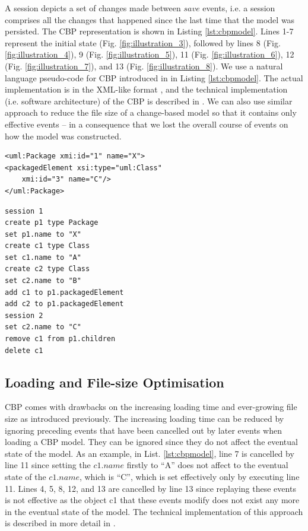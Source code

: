 \documentclass[sigplan,review,anonymous]{acmart}\settopmatter{printfolios=true,printccs=false,printacmref=false}
\begin{document}
A session depicts a set of changes made between $save$ events, i.e. a session comprises all the changes that happened since the last time that the model was persisted. The CBP representation is shown in Listing \ref{lst:cbpmodel}. Lines 1-7 represent the initial state (Fig. \ref{fig:illustration_3}), followed by lines 8 (Fig. \ref{fig:illustration_4}), 9 (Fig. \ref{fig:illustration_5}), 11 (Fig. \ref{fig:illustration_6}), 12 (Fig. \ref{fig:illustration_7}), and 13 (Fig. \ref{fig:illustration_8}). We use a natural language pseudo-code for CBP introduced in \cite{DBLP:conf/models/YohannisKP17,yohannis2018towards} in Listing \ref{lst:cbpmodel}. The actual implementation is in the XML-like format \cite{DBLP:conf/models/YohannisKP17}, and the technical implementation (i.e. software architecture) of the CBP is described in \cite{DBLP:conf/models/YohannisKP17}.  We can also use similar approach to reduce the file size of a change-based model so that it contains only effective events -- in a consequence that we lost the overall course of events on how the model was constructed.

\begin{lstlisting}[style=xmi,caption={The second version of the UML2 example model.},label=lst:xmimodel2]
<uml:Package xmi:id="1" name="X">
<packagedElement xsi:type="uml:Class" 
    xmi:id="3" name="C"/>
</uml:Package>
\end{lstlisting}

\begin{lstlisting}[style=eol,caption={The text CBP of producing state-based model in List. \ref{lst:xmimodel2}. Its visual illustration is in Fig. \ref{fig:illustration_cbp}.},label=lst:cbpmodel]
session 1
create p1 type Package
set p1.name to "X" 
create c1 type Class
set c1.name to "A"
create c2 type Class
set c2.name to "B"
add c1 to p1.packagedElement 
add c2 to p1.packagedElement
session 2
set c2.name to "C"
remove c1 from p1.children 
delete c1
\end{lstlisting}

\subsection{Loading and File-size Optimisation}
CBP comes with drawbacks on the increasing loading time and ever-growing file size as introduced previously. The increasing loading time can be reduced by ignoring preceding events that have been cancelled out by later events when loading a CBP model. They can be ignored since they do not affect the eventual state of the model. As an example, in List. \ref{lst:cbpmodel}, line 7 is cancelled by line 11 since setting the $c1$.$name$ firstly to ``A'' does not affect to the eventual state of the $c1$.$name$, which is ``C'', which is set effectively only by executing line 11. Lines 4, 5, 8, 12, and 13 are cancelled by line 13 since replaying these events is not effective as the object c1 that these events modify does not exist any more in the eventual state of the model. The technical implementation of this approach is described in more detail in \cite{yohannis2018towards}.
\end{document}

